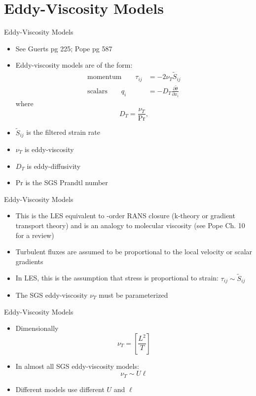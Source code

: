 \section{Eddy-Viscosity Models} %
\begin{frame}{Eddy-Viscosity Models}
\begin{itemize}
	\item See Guerts pg 225; Pope pg 587
	\item Eddy-viscosity models are of the form:
	\begin{align*}
		\text{momentum} \qquad \tau_{ij} &= -2\nu_{T} \widetilde{S}_{ij}\\
		\text{scalars} \qquad q_i &= -D_T \frac{\partial \widetilde{\theta}}{\partial x_i}
	\end{align*}
	where
	$$D_T = \frac{\nu_T}{\text{Pr}},$$
	\item $\widetilde{S}_{ij}$ is the filtered strain rate
	\item $\nu_T$ is eddy-viscosity
	\item $D_T$ is eddy-diffusivity
	\item Pr is the SGS Prandtl number 
\end{itemize}

\end{frame}

\begin{frame}{Eddy-Viscosity Models}
\begin{itemize}
	\item This is the LES equivalent to -order RANS closure (k-theory or gradient transport theory) and is an analogy to molecular viscosity (see Pope Ch. 10 for a review)
	\item Turbulent fluxes are assumed to be proportional to the local velocity or scalar gradients
	\item In LES, this is the assumption that stress is proportional to strain: $\tau_{ij} \sim \widetilde{S}_{ij}$
	\item The SGS eddy-viscosity $\nu_T$ must be parameterized   
\end{itemize}

\end{frame}

\begin{frame}{Eddy-Viscosity Models}
\begin{itemize}
	\item Dimensionally
	$$\nu_T = \left[ \frac{L^2}{T}\right]$$
	\item In almost all SGS eddy-viscosity models:
	$$\nu_T \sim U\ell$$
	\item Different models use different $U$ and $\ell$
\end{itemize}

\end{frame}


